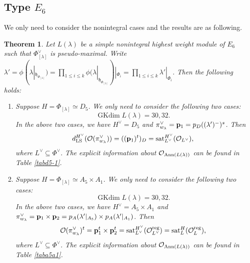 \documentclass[reqno,12pt]{amsart}
\numberwithin{equation}{section}
\theoremstyle{plain}
\newtheorem{Thm}{Theorem}[section]
\theoremstyle{definition}
\newcommand{\lam}{\lambda}
\newcommand{\Ann}{\mathrm{Ann}}
\renewcommand{\subset}{\subseteq}
\newcommand{\gkd}{\operatorname{GKdim}}
\newcommand{\lest}{\leqslant}
\begin{document}
\subsection{Type \texorpdfstring{$E_6$}{}} We only need to consider the nonintegral cases and the results
are as following.
\begin{Thm}\label{e6-av}
Let $L(\lam)$ be a simple nonintegral highest weight module of $E_6$ such that $\Phi_{[\lam]}^\vee$ is pseudo-maximal. Write $\lam'=\phi(\lam|_{\mathfrak{h}_{\Phi_{[\lambda]}}})=\prod\limits_{1\lest i\lest k} \phi(\lambda|_{\mathfrak{h}_{\Phi_{[\lambda]}}})|_{{\Phi_i}}=\prod\limits_{1\lest i\lest k} \lam'|_{{\Phi_i}}$.
	Then
    the following holds:
    \begin{enumerate}
	\item Suppose $H=\Phi_{[\lam]}\simeq D_5$. We only need to consider the following two cases:
$$\gkd L(\lam)=30, 32.$$
In the above two cases, we have $H^{\vee}=D_5$ and   
$\pi^{\vee}_{w_{\lam}}={\bf p}_{1}=p_{D}((\lam')^-)^s$. Then $$d_{\rm LS}^{H^\vee} (\mathcal{O}(\pi_{w_{\lam}}^\vee))=(({\bf p}_{1})^t)_D = {\rm sat}_{L^\vee}^{H^\vee} (\mathcal{O}_{L^\vee}),$$
where $L^\vee \subset \Phi^\vee$. The explicit information about $\mathcal{O}_{{\rm Ann}(L(\lambda))}$ can be found in Table \ref{tabd5-1}.







\item Suppose $H=\Phi_{[\lam]}\simeq A_5\times A_1$. 
We only need to consider the following two cases:
$$\gkd L(\lam)=30, 32.$$
In the above two cases, we have $H^{\vee}=A_5\times A_1$ and   
$\pi^{\vee}_{w_{\lam}}={\bf p}_{1}\times {\bf p}_{2}=p_{A}(\lam'|_{A_5})\times p_{A}(\lam'|_{{A}_1})$. Then $$\mathcal{O}(\pi^{\vee}_{w_{\lam}})^t={\bf p}^t_{1}\times {\bf p}^t_{2} = {\rm sat}_{L^\vee}^{H^\vee} (\mathcal{O}_{L^\vee}^{\rm reg})={\rm sat}_{L}^{H} (\mathcal{O}_{L}^{\rm reg}),$$
where $L^\vee \subset \Phi^\vee$. The explicit information about $\mathcal{O}_{{\rm Ann}(L(\lambda))}$ can be found in Table \ref{taba5a1}.





\end{enumerate}
\end{Thm}
\end{document}

